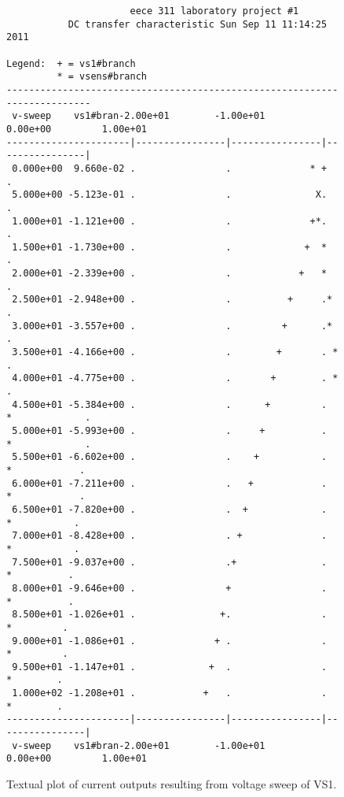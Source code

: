\documentclass{article}
\begin{document}
\begin{figure}

{\footnotesize
\begin{verbatim}
                      eece 311 laboratory project #1
           DC transfer characteristic Sun Sep 11 11:14:25  2011

Legend:  + = vs1#branch       
         * = vsens#branch     
--------------------------------------------------------------------------
 v-sweep    vs1#bran-2.00e+01        -1.00e+01         0.00e+00         1.00e+01
----------------------|----------------|----------------|----------------|
 0.000e+00  9.660e-02 .                .              * +                .
 5.000e+00 -5.123e-01 .                .               X.                .
 1.000e+01 -1.121e+00 .                .              +*.                .
 1.500e+01 -1.730e+00 .                .             +  *                .
 2.000e+01 -2.339e+00 .                .            +   *                .
 2.500e+01 -2.948e+00 .                .          +     .*               .
 3.000e+01 -3.557e+00 .                .         +      .*               .
 3.500e+01 -4.166e+00 .                .        +       . *              .
 4.000e+01 -4.775e+00 .                .       +        . *              .
 4.500e+01 -5.384e+00 .                .      +         .  *             .
 5.000e+01 -5.993e+00 .                .     +          .  *             .
 5.500e+01 -6.602e+00 .                .    +           .   *            .
 6.000e+01 -7.211e+00 .                .   +            .   *            .
 6.500e+01 -7.820e+00 .                .  +             .    *           .
 7.000e+01 -8.428e+00 .                . +              .    *           .
 7.500e+01 -9.037e+00 .                .+               .     *          .
 8.000e+01 -9.646e+00 .                +                .     *          .
 8.500e+01 -1.026e+01 .               +.                .      *         .
 9.000e+01 -1.086e+01 .              + .                .      *         .
 9.500e+01 -1.147e+01 .             +  .                .       *        .
 1.000e+02 -1.208e+01 .            +   .                .       *        .
----------------------|----------------|----------------|----------------|
 v-sweep    vs1#bran-2.00e+01        -1.00e+01         0.00e+00         1.00e+01
\end{verbatim}
}

\caption{Textual plot of current outputs resulting from voltage sweep of VS1.}
\label{fig:spicecurplot}
\end{figure}
\end{document}

